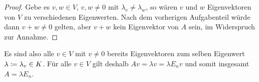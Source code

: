 \begin{proof}
  Gebe es $v, w \in V$, $v, w \neq 0$ mit $\lambda_v \neq \lambda_w$, so wären $v$ und $w$ Eigenvektoren von $V$ zu verschiedenen Eigenwerten.
  Nach dem vorherigen Aufgabenteil würde dann $v + w \neq 0$ gelten, aber $v + w$ kein Eigenvektor von $A$ sein, im Widerspruch zur Annahme.
\end{proof}

Es sind also alle $v \in V$ mit $v \neq 0$ bereits Eigenvektoren zum selben Eigenwert $\lambda \coloneqq \lambda_v \in K$.
Für alle $v \in V$ gilt deshalb $Av = \lambda v = \lambda E_n v$ und somit insgesamt $A = \lambda E_n$.





